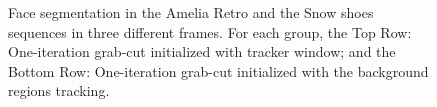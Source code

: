 {\begin{figure}[tpb]
      \caption{Face segmentation in the Amelia Retro and the
	      Snow shoes sequences in three different frames. For each
	       group, the Top Row: One-iteration grab-cut initialized with tracker window;
	       and the Bottom Row: One-iteration grab-cut initialized with the background regions tracking.}
      \label{figurelabel_comp}
   \end{figure}
}
